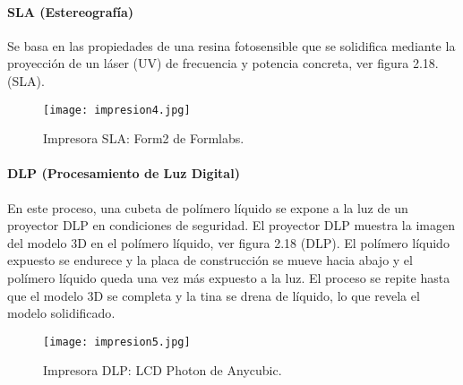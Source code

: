 \paragraph{SLA (Estereografía)}
Se basa en las propiedades de una resina fotosensible que se solidifica mediante la proyección de un láser (UV) de frecuencia y potencia concreta, ver figura 2.18. (SLA)\cite{impresoras3d-valverde}.

\begin{figure}[H]
	\centering
	\texttt{[image: impresion4.jpg]}
	\caption{Impresora SLA: Form2 de Formlabs.}
\end{figure}

\paragraph{DLP (Procesamiento de Luz Digital)}
En este proceso, una cubeta de polímero líquido se expone a la luz de un proyector DLP en condiciones de seguridad. El proyector DLP muestra la imagen del modelo 3D en el polímero líquido, ver figura 2.18 (DLP). El polímero líquido expuesto se endurece y la placa de construcción se mueve hacia abajo y el polímero líquido queda una vez más expuesto a la luz. El proceso se repite hasta que el modelo 3D se completa y la tina se drena de líquido, lo que revela el modelo solidificado\cite{impresoras3d-blog}.

\begin{figure}[H]
	\centering
	\texttt{[image: impresion5.jpg]}
	\caption{Impresora DLP: LCD Photon de Anycubic.}
\end{figure}


